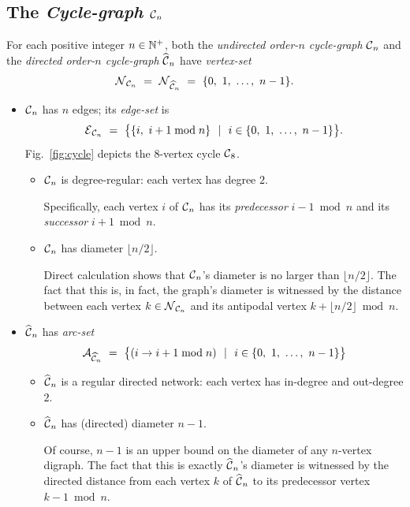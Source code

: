 \subsection{The {\it Cycle-graph} $\mbox{$\cal C$}_n$}
\label{sec:cycle}

  
 

For each positive integer $n \in \mathbb{N}^+$, both the {\it undirected order-$n$ cycle-graph} $\mbox{$\cal C$}_n$ and the {\it directed order-$n$ cycle-graph} $\widehat{\mbox{$\cal C$}}_n$  have {\it vertex-set}
\[ \n_{{\cal C}_n} \ = \ \n_{\widehat{{\cal C}}_n} \ = \ \{ 0, \ 1, \ \ldots, \ n-1\}. \]
\begin{itemize}
\item
$\mbox{$\cal C$}_n$ has $n$ edges; its {\it edge-set} is
\[ \mbox{$\cal E$}_{{\cal C}_n} \ = \ \big\{ \{i, \ i+1 \bmod n\} \ \ | \ \ i \in \{0, \ 1, \ \ldots, \ n-1\} \big\}.  \]
Fig.~\ref{fig:cycle} depicts the $8$-vertex cycle $\mbox{$\cal C$}_8$.
  \begin{itemize}
  \item
$\mbox{$\cal C$}_n$ is degree-regular: each vertex has degree $2$.

\smallskip

Specifically, each vertex $i$ of $\mbox{$\cal C$}_n$ has its {\it predecessor} $i-1 \bmod n$ and its {\it successor} $i+1 \bmod n$.

  \medskip\item 
$\mbox{$\cal C$}_n$ has diameter $\lfloor n/2 \rfloor$.

\smallskip

Direct calculation shows that $\mbox{$\cal C$}_n$'s diameter is no larger than $\lfloor n/2 \rfloor$.  The fact that this is, in fact, the graph's diameter is witnessed by the distance between each vertex $k \in \mbox{$\cal N$}_{{\cal C}_n}$ and its antipodal vertex $k + \lfloor n/2 \rfloor \bmod n$.
  \end{itemize}

\medskip\item
$\widehat{\mbox{$\cal C$}}_n$ has {\it arc-set}
\[ \a_{\widehat{{\cal C}}_n} \ = \ 
\big\{ (i \rightarrow i+1 \bmod n) \ \ | \ \ i \in \{0, \ 1, \ \ldots, \ n-1\} \big\}
\]
  \begin{itemize}
  \item 
$\widehat{\mbox{$\cal C$}}_n$ is a regular directed network: each vertex has in-degree and out-degree $2$.
  \medskip\item
$\widehat{\mbox{$\cal C$}}_n$ has (directed) diameter $n-1$.

\smallskip

Of course, $n-1$ is an upper bound on the diameter of any $n$-vertex digraph.  The fact that this is exactly $\widehat{\mbox{$\cal C$}}_n$'s diameter is witnessed by the directed distance from each vertex $k$ of $\widehat{\mbox{$\cal C$}}_n$ to its predecessor vertex $k-1 \bmod n$.
  \end{itemize}
\end{itemize}

